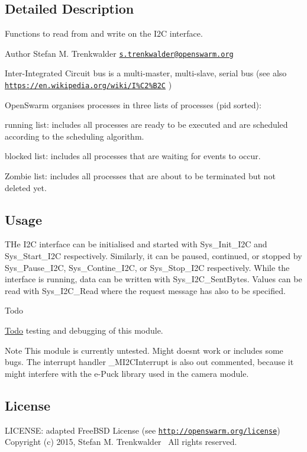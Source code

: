 \subsection{Detailed Description}
Functions to read from and write on the I2\+C interface. 

\begin{DoxyAuthor}{Author}
Stefan M. Trenkwalder \href{mailto:s.trenkwalder@openswarm.org}{\tt s.\+trenkwalder@openswarm.\+org}
\end{DoxyAuthor}
Inter-\/\+Integrated Circuit bus is a multi-\/master, multi-\/slave, serial bus (see also \href{https://en.wikipedia.org/wiki/I%C2%B2C}{\tt https\+://en.\+wikipedia.\+org/wiki/\+I\%\+C2\%\+B2\+C} )

Open\+Swarm organises processes in three lists of processes (pid sorted)\+:
\begin{DoxyEnumerate}
\item running list\+: includes all processes are ready to be executed and are scheduled according to the scheduling algorithm.
\item blocked list\+: includes all processes that are waiting for events to occur.
\item Zombie list\+: includes all processes that are about to be terminated but not deleted yet.
\end{DoxyEnumerate}\hypertarget{group__i2c_i2c_usage}{}\subsection{Usage}\label{group__i2c_i2c_usage}
T\+He I2\+C interface can be initialised and started with Sys\+\_\+\+Init\+\_\+\+I2\+C and Sys\+\_\+\+Start\+\_\+\+I2\+C respectively. Similarly, it can be paused, continued, or stopped by Sys\+\_\+\+Pause\+\_\+\+I2\+C, Sys\+\_\+\+Contine\+\_\+\+I2\+C, or Sys\+\_\+\+Stop\+\_\+\+I2\+C respectively. While the interface is running, data can be written with Sys\+\_\+\+I2\+C\+\_\+\+Sent\+Bytes. Values can be read with Sys\+\_\+\+I2\+C\+\_\+\+Read where the request message has also to be specified.

\begin{DoxyRefDesc}{Todo}
\item[\hyperlink{todo__todo000006}{Todo}]testing and debugging of this module.\end{DoxyRefDesc}


\begin{DoxyNote}{Note}
This module is currently untested. Might doesn\textquotesingle{}t work or includes some bugs. The interrupt handler \+\_\+\+M\+I2\+C\+Interrupt is also out commented, because it might interfere with the e-\/\+Puck library used in the camera module.
\end{DoxyNote}
\hypertarget{group__i2c_i2c_license}{}\subsection{License}\label{group__i2c_i2c_license}
L\+I\+C\+E\+N\+S\+E\+: adapted Free\+B\+S\+D License (see \href{http://openswarm.org/license}{\tt http\+://openswarm.\+org/license})~\newline
Copyright (c) 2015, Stefan M. Trenkwalder~\newline
All rights reserved. 
